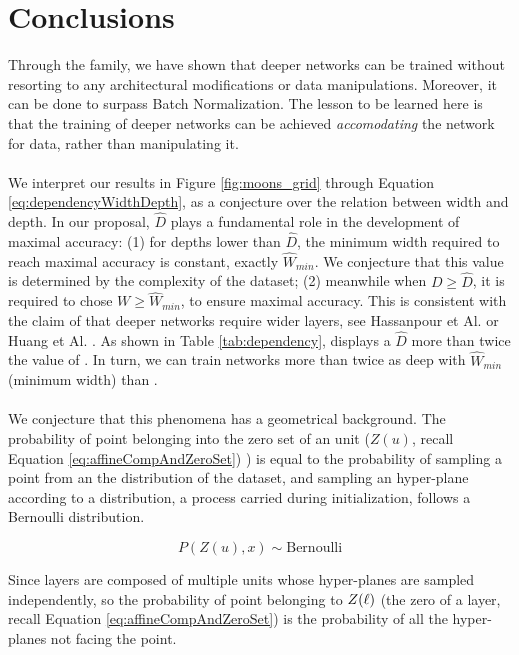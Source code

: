 \section{Conclusions}\label{sec:conclusions}
Through the \SepConstraint family, we have shown that deeper networks can be trained without resorting to any architectural modifications or data manipulations. Moreover, it can be done to surpass Batch Normalization. The lesson to be learned here is that the training of deeper networks can be achieved \emph{accomodating} the network for data, rather than manipulating it.
\\\\
We interpret our results in Figure \ref{fig:moons_grid} through Equation \ref{eq:dependencyWidthDepth}, as a conjecture over the relation between width and depth. In our proposal, $\hat{D}$ plays a fundamental role in the development of maximal accuracy: (1) for depths lower than $\hat{D}$, the minimum width required to reach maximal accuracy is constant, exactly $\hat{W}_{min}$. We conjecture that this value is determined by the complexity of the dataset; (2) meanwhile when  $D\geq \hat{D}$, it is required to chose $W \geq \hat{W}_{min}$, to ensure maximal accuracy. This is consistent with the claim of that deeper networks require wider layers, see Hassanpour et Al. \cite{simpnet} or Huang et Al. \cite{densenet}. As shown in Table \ref{tab:dependency}, \SepUnitPoint displays a $\hat{D}$ more than twice the value of \ReLUBN. In turn, we can train networks more than twice as deep with $\hat{W}_{min}$ (minimum width) than \ReLUBN. 
\\\\
We conjecture that this phenomena has a geometrical background. The probability of point belonging into the zero set of an unit ($Z(u)$, recall Equation \ref{eq:affineCompAndZeroSet}) ) is equal to the probability of sampling a point from an the distribution of the dataset, and sampling an hyper-plane according to a distribution, a process carried during initialization, follows a Bernoulli distribution.

\begin{equation}
    P(Z(u), x) \sim \text{Bernoulli}
    \label{eq:probabilityUnit}
\end{equation}

Since layers are composed of multiple units whose hyper-planes are sampled independently, so the probability of point belonging to $Z(\ell)$ (the zero of a layer, recall Equation \ref{eq:affineCompAndZeroSet}) is the probability of all the hyper-planes not facing the point.

